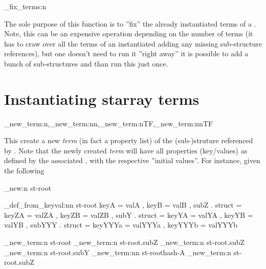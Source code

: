 \documentclass[10pt]{article}
\begin{document}
\begin{codedescribe}{\starray_fix_terms:n}
\begin{codesyntax}%
\end{codesyntax}
The sole purpose of this function is to ''fix'' the already instantiated terms of a . Note, this can be an expensive operation depending on the number of terms (it has to craw over all the terms of an instantiated  adding any missing sub-structure references), but one doesn't need to run it ''right away'' it is possible to add a bunch of sub-structures and than run this just once.
\end{codedescribe}


\section{Instantiating starray terms}\label{pack:instantiate}

\begin{codedescribe}{\starray_new_term:n,\starray_new_term:nn,\starray_new_term:nTF,\starray_new_term:nnTF}
\begin{codesyntax}%
\end{codesyntax}
This create a new \textsl{term} (in fact a property list) of the (sub-)struture referenced by . Note that the newly created \textsl{term} will have all properties (key/values) as defined by the associated , with the respective ''initial values''. For instance, given the following 
\end{codedescribe}

\begin{codestore}[store-env=keyval.demo2]
\starray_new:n {st-root}

\starray_def_from_keyval:nn {st-root} 
  {
    keyA = valA ,
    keyB = valB ,
    subZ . struct = 
      {
        keyZA = valZA ,
        keyZB = valZB ,
      }
    subY . struct =
      {
        keyYA = valYA ,
        keyYB = valYB ,
        subYYY . struct =
          {
            keyYYYa = valYYYa ,
            keyYYYb = valYYYb 
          }
      }
  }
  
\starray_new_term:n {st-root}
\starray_new_term:n {st-root.subZ}
\starray_new_term:n {st-root.subZ}
\starray_new_term:n {st-root.subY}
\starray_new_term:nn {st-root}{hash-A}
\starray_new_term:n {st-root.subZ}
\end{codestore}
\end{document}
